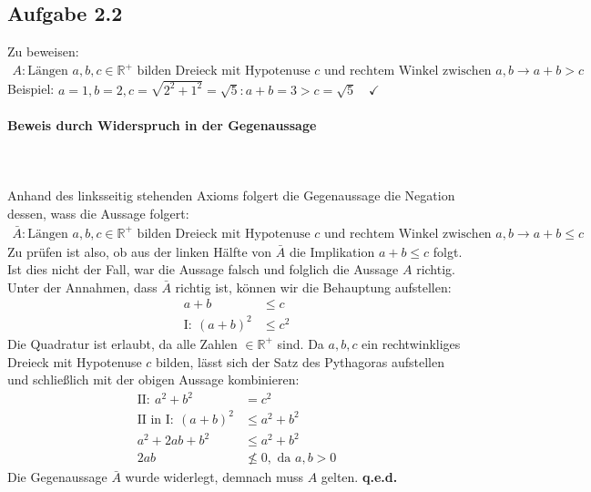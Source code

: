 \documentclass{article}
\begin{document}
    \subsection*{Aufgabe 2.2}
    Zu beweisen:
    \begin{align*}
        A: \textrm{Längen } a, b, c \in \mathbb{R}^+ \textrm{ bilden Dreieck mit Hypotenuse } c \textrm{ und rechtem Winkel zwischen } a, b \rightarrow a+b>c
    \end{align*}
    Beispiel: $a=1, b=2, c=\sqrt{2^2+1^2} = \sqrt{5}: a+b = 3 > c = \sqrt{5} \quad \checkmark$
    
    \paragraph*{Beweis durch Widerspruch in der Gegenaussage} \hfill\\\\
    Anhand des linksseitig stehenden Axioms folgert die Gegenaussage die Negation dessen, wass die Aussage folgert:
    \begin{align*}
        \bar{A}: \textrm{Längen } a, b, c \in \mathbb{R}^+ \textrm{ bilden Dreieck mit Hypotenuse } c \textrm{ und rechtem Winkel zwischen } a, b \rightarrow a+b\leq c
    \end{align*}
    Zu prüfen ist also, ob aus der linken Hälfte von $\bar{A}$ die Implikation $a+b\leq c$ folgt. Ist dies nicht der Fall, war die Aussage falsch und folglich die Aussage $A$ richtig. \\
    Unter der Annahmen, dass $\bar{A}$ richtig ist, können wir die Behauptung aufstellen:
    \begin{align*}
        a+b &\leq c\\
        \textrm{I}: \: (a+b)^2 &\leq c^2
    \end{align*}
    Die Quadratur ist erlaubt, da alle Zahlen $\in \mathbb{R}^+$ sind. Da $a,b,c$ ein rechtwinkliges Dreieck mit Hypotenuse $c$ bilden, lässt sich der Satz des Pythagoras aufstellen und schließlich mit der obigen Aussage kombinieren:
    \begin{align*}
        \textrm{II}: \: a^2+b^2 &= c^2 \\
        \textrm{II in I}: \: (a+b)^2 &\leq a^2 + b^2 \\
        a^2 + 2ab + b^2 &\leq a^2 + b^2 \\
        2ab &\nleq 0, \textrm{ da } a,b>0
    \end{align*}
    Die Gegenaussage $\bar{A}$ wurde widerlegt, demnach muss $A$ gelten. \textbf{q.e.d.}
\end{document}
